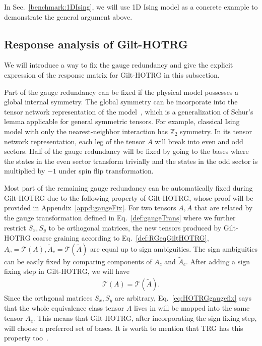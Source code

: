 \documentclass[aps,prb,reprint,superscriptaddress]{revtex4-2}
\begin{document}
In Sec.~\ref{benchmark:1DIsing}, we will use 1D Ising model as a
concrete example to demonstrate the general argument above.
%

\subsection{Response analysis of Gilt-HOTRG\label{RespAnaGiltHOTRG}}
We will introduce a way to fix the gauge redundancy and give the
explicit expression of the response matrix for Gilt-HOTRG in this
subsection.
%

Part of the gauge redundancy can be fixed if the physical model
possesses a global internal symmetry. The global symmetry can be
incorporate into the tensor network representation of the
model~\cite{Singh2010SymTen,Singh2011U1Ten,Singh2012SU2Ten}, which is a
generalization of Schur's lemma applicable for general symmetric
tensors. For example, classical Ising model with only the
nearest-neighbor interaction has $\mathbb{Z}_2$ symmetry. In its tensor
network representation, each leg of the tensor $A$ will break into even
and odd sectors. Half of the gauge redundancy will be fixed by going to
the bases where the states in the even sector transform trivially and
the states in the odd sector is multiplied by $-1$ under spin flip
transformation.
%

Most part of the remaining gauge redundancy can be automatically fixed
during Gilt-HOTRG due to the following property of Gilt-HOTRG, whose
proof will be provided in Appendix~\ref{appd:gaugeFix}. For two tensors
$A, \tilde{A}$ that are related by the gauge transformation defined in
Eq.~\eqref{def:gaugeTrans} where we further restrict $S_x,S_y$ to be
orthogonal matrices, 
the new tensors produced by Gilt-HOTRG coarse graining according to
Eq.~\eqref{def:RGeqGiltHOTRG}, $A_c = \mathcal{T}\left(A\right),
\tilde{A}_c = \mathcal{T}(\tilde{A})$ are equal up to sign ambiguities.
The sign ambiguities can be easily fixed by comparing components of
$A_c$ and $\tilde{A}_c$. After adding a sign fixing step in Gilt-HOTRG,
we will have
%
\begin{align}\label{eq:HOTRGgaugefix}
    \mathcal{T}(A) = \mathcal{T}(\tilde{A}).
\end{align}
%
Since the orthgonal matrices $S_x, S_y$ are arbitrary,
Eq.~\eqref{eq:HOTRGgaugefix} says that the whole equivalence class tensor
$A$ lives in will be mapped into the same tensor $A_c$. This means
that Gilt-HOTRG, after incorporating the sign fixing step, will choose a
preferred set of bases. It is worth to mention that TRG has this
property too~\cite{kadanoff2014}.
%
\end{document}
